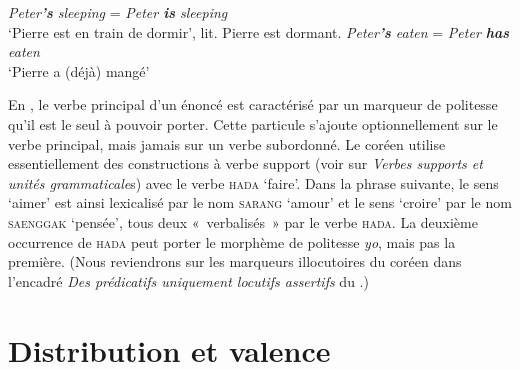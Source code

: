 {    \ea
      \ea \textit{{Peter}\textbf{{’s}}  {sleeping}} =  \textit{{Peter} \textbf{{is}}  {sleeping}} \\\glt ‘Pierre est en train de dormir’, lit. Pierre est dormant.
      \ex \textit{{Peter}\textbf{{’s}}  {eaten}}   =   \textit{{Peter} \textbf{{has}}  {eaten}}  \\\glt ‘Pierre a (déjà) mangé’
        \z
    \z
   
   En , le verbe principal d’un énoncé est caractérisé par un marqueur de politesse qu’il est le seul à pouvoir porter. Cette particule s’ajoute optionnellement sur le verbe principal, mais jamais sur un verbe subordonné. Le coréen utilise essentiellement des constructions à verbe support (voir  sur \textit{Verbes supports et unités grammaticale}s) avec le verbe \textsc{hada} ‘faire’. Dans la phrase suivante, le sens ‘aimer’ est ainsi lexicalisé par le nom \textsc{sarang} ‘amour’ et le sens ‘croire’ par le nom \textsc{saenggak} ‘pensée’, tous deux «~verbalisés~» par le verbe \textsc{hada}. La deuxième occurrence de \textsc{hada} peut porter le morphème de politesse \textit{yo}, mais pas la première. (Nous reviendrons sur les marqueurs illocutoires du coréen dans l’encadré \textit{Des prédicatifs uniquement locutifs assertifs} du .)

    \ea \let\eachwordone\cjkfont
    \z
    \z
}
\section{Distribution et valence}\label{sec:3.3.10}


